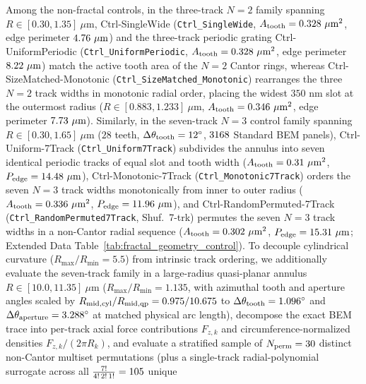 \documentclass[pdflatex,sn-nature]{sn-jnl}
\DeclareRobustCommand{\roundzero}[1]{\fpeval{round(#1,0)}}
\DeclareRobustCommand{\roundtwo}[1]{\fpeval{round(#1,2)}}
\DeclareRobustCommand{\roundthree}[1]{\fpeval{round(#1,3)}}
\begin{document}
Among the non-fractal controls, in the three-track $N=2$ family spanning $R \in [0.30, 1.35]\ \mu\text{m}$, Ctrl-SingleWide (\texttt{Ctrl\_SingleWide}, $A_{\rm tooth} = \roundthree{\FractalCtrlSinglewideActiveToothAreaUmtwo}\ \mu\text{m}^2$, edge perimeter $\roundtwo{\FractalCtrlSinglewideEdgePerimeterUm}\ \mu\text{m}$) and the three-track periodic grating Ctrl-UniformPeriodic (\texttt{Ctrl\_UniformPeriodic}, $A_{\rm tooth} = \roundthree{\FractalCtrlUniformperiodicActiveToothAreaUmtwo}\ \mu\text{m}^2$, edge perimeter $\roundtwo{\FractalCtrlUniformperiodicEdgePerimeterUm}\ \mu\text{m}$) match the active tooth area of the $N=2$ Cantor rings, whereas Ctrl-SizeMatched-Monotonic (\texttt{Ctrl\_SizeMatched\_Monotonic}) rearranges the three $N=2$ track widths in monotonic radial order, placing the widest $350\text{ nm}$ slot at the outermost radius ($R \in [0.883, 1.233]\ \mu\text{m}$, $A_{\rm tooth} = \roundthree{\FractalCtrlSizematchedMonotonicActiveToothAreaUmtwo}\ \mu\text{m}^2$, edge perimeter $\roundtwo{\FractalCtrlSizematchedMonotonicEdgePerimeterUm}\ \mu\text{m}$). Similarly, in the seven-track $N=3$ control family spanning $R \in [0.30, 1.65]\ \mu\text{m}$ ($28$ teeth, $\Delta\theta_{\rm tooth} = 12^\circ$, $3168{}$ Standard BEM panels), Ctrl-Uniform-7Track (\texttt{Ctrl\_Uniform7Track}) subdivides the annulus into seven identical periodic tracks of equal slot and tooth width ($A_{\rm tooth} = \roundthree{\NatureCtrlNthreeUniformseventrackFullToothPlanformAreaUmtwo}\ \mu\text{m}^2$, $P_{\rm edge} = \roundtwo{\NatureCtrlNthreeUniformseventrackFullToothPlanformPerimeterUm}\ \mu\text{m}$), Ctrl-Monotonic-7Track (\texttt{Ctrl\_Monotonic7Track}) orders the seven $N=3$ track widths monotonically from inner to outer radius ($A_{\rm tooth} = \roundthree{\NatureCtrlNthreeMonotonicseventrackFullToothPlanformAreaUmtwo}\ \mu\text{m}^2$, $P_{\rm edge} = \roundtwo{\NatureCtrlNthreeMonotonicseventrackFullToothPlanformPerimeterUm}\ \mu\text{m}$), and Ctrl-RandomPermuted-7Track (\texttt{Ctrl\_RandomPermuted7Track}, Shuf.\ 7-trk) permutes the seven $N=3$ track widths in a non-Cantor radial sequence ($A_{\rm tooth} = \roundthree{\NatureCtrlNthreeShuffledseventrackFullToothPlanformAreaUmtwo}\ \mu\text{m}^2$, $P_{\rm edge} = \roundtwo{\NatureCtrlNthreeShuffledseventrackFullToothPlanformPerimeterUm}\ \mu\text{m}$; Extended Data Table~\ref{tab:fractal_geometry_control}). To decouple cylindrical curvature ($R_{\max}/R_{\min} = 5.5$) from intrinsic track ordering, we additionally evaluate the seven-track family in a large-radius quasi-planar annulus $R \in [10.0, 11.35]\ \mu\text{m}$ ($R_{\max}/R_{\min} = 1.135$, with azimuthal tooth and aperture angles scaled by $R_{\rm mid,cyl}/R_{\rm mid,qp} = 0.975/10.675$ to $\Delta\theta_{\rm tooth} = 1.096^\circ$ and $\Delta\theta_{\rm aperture} = 3.288^\circ$ at matched physical arc length), decompose the exact BEM trace into per-track axial force contributions $F_{z,k}$ and circumference-normalized densities $F_{z,k}/(2\pi R_k)$, and evaluate a stratified sample of $N_{\rm perm} = \roundzero{\NthreePermNEvaluated}$ distinct non-Cantor multiset permutations (plus a single-track radial-polynomial surrogate across all $\frac{7!}{4!\,2!\,1!} = \roundzero{\NthreePermNUniqueMultiset}$ unique 
\end{document}
